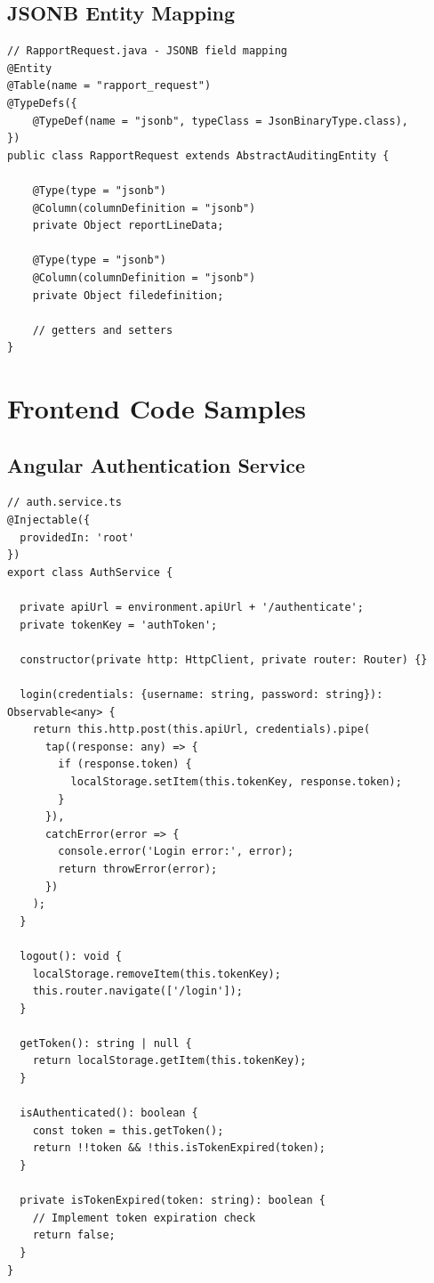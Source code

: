 \subsection{JSONB Entity Mapping}

\begin{lstlisting}
// RapportRequest.java - JSONB field mapping
@Entity
@Table(name = "rapport_request")
@TypeDefs({
    @TypeDef(name = "jsonb", typeClass = JsonBinaryType.class),
})
public class RapportRequest extends AbstractAuditingEntity {

    @Type(type = "jsonb")
    @Column(columnDefinition = "jsonb")
    private Object reportLineData;

    @Type(type = "jsonb")
    @Column(columnDefinition = "jsonb")
    private Object filedefinition;

    // getters and setters
}
\end{lstlisting}

\section{Frontend Code Samples}

\subsection{Angular Authentication Service}

\begin{lstlisting}
// auth.service.ts
@Injectable({
  providedIn: 'root'
})
export class AuthService {

  private apiUrl = environment.apiUrl + '/authenticate';
  private tokenKey = 'authToken';

  constructor(private http: HttpClient, private router: Router) {}

  login(credentials: {username: string, password: string}): Observable<any> {
    return this.http.post(this.apiUrl, credentials).pipe(
      tap((response: any) => {
        if (response.token) {
          localStorage.setItem(this.tokenKey, response.token);
        }
      }),
      catchError(error => {
        console.error('Login error:', error);
        return throwError(error);
      })
    );
  }

  logout(): void {
    localStorage.removeItem(this.tokenKey);
    this.router.navigate(['/login']);
  }

  getToken(): string | null {
    return localStorage.getItem(this.tokenKey);
  }

  isAuthenticated(): boolean {
    const token = this.getToken();
    return !!token && !this.isTokenExpired(token);
  }

  private isTokenExpired(token: string): boolean {
    // Implement token expiration check
    return false;
  }
}
\end{lstlisting}

